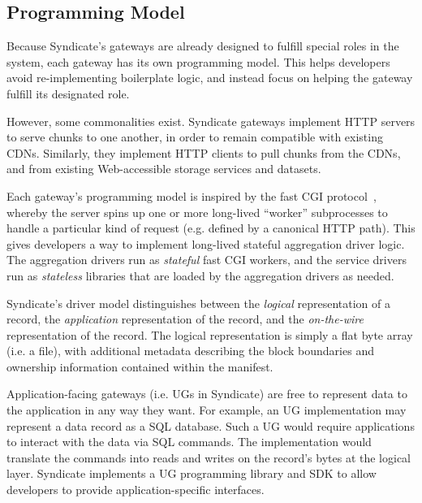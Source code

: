 \subsection{Programming Model}

Because Syndicate's gateways are already designed to fulfill special roles in
the system, each gateway has its own programming model.  This helps developers
avoid re-implementing boilerplate logic, and instead focus on helping the
gateway fulfill its designated role.

However, some commonalities exist.
Syndicate gateways implement HTTP servers to serve chunks to one
another, in order to remain compatible with existing CDNs.  Similarly, they
implement HTTP clients to pull chunks from the CDNs, and from existing
Web-accessible storage services and datasets.

Each gateway's programming model is inspired by the fast CGI protocol~\cite{fastcgi},
whereby the server spins up one or more long-lived ``worker'' subprocesses to
handle a particular kind of request (e.g. defined by a canonical HTTP path).
This gives developers a way to implement long-lived stateful aggregation driver
logic.  The aggregation drivers run as \emph{stateful} fast CGI workers, and
the service drivers run as \emph{stateless} libraries that are loaded by the
aggregation drivers as needed.

Syndicate's driver model distinguishes between the \emph{logical} representation of a record,
the \emph{application} representation of the record, and the 
\emph{on-the-wire} representation of the record.  The logical representation is
simply a flat byte array (i.e. a file), with
additional metadata describing the block boundaries and ownership information
contained within the manifest.

Application-facing gateways (i.e. UGs in Syndicate) are free to represent data 
to the application in any way they want.  For example, an UG implementation
may represent a data record as a
SQL database.  Such a UG would require applications to interact with the data
via SQL commands.  The implementation would translate the commands into
reads and writes on the record's bytes
at the logical layer.  Syndicate implements a UG programming library and
SDK to allow developers to provide application-specific interfaces.

